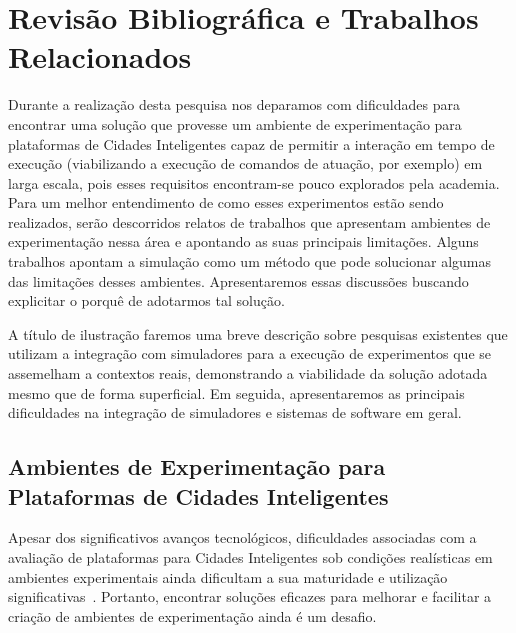 \chapter{Revisão Bibliográfica e Trabalhos Relacionados}
\label{cap:trab-relacionados}

Durante a realização desta pesquisa nos deparamos com dificuldades para encontrar uma solução que provesse um ambiente de experimentação para plataformas de Cidades Inteligentes capaz de permitir a
interação em tempo de execução (viabilizando a execução de comandos de atuação, por exemplo) em larga escala, pois esses requisitos encontram-se pouco explorados pela academia.
Para um melhor entendimento de como esses experimentos estão sendo realizados, serão descorridos relatos de trabalhos que apresentam ambientes de experimentação nessa área e apontando as suas
principais limitações.
Alguns trabalhos apontam a simulação como um método que pode solucionar algumas das limitações desses ambientes.
Apresentaremos essas discussões buscando explicitar o porquê de adotarmos tal solução.

A título de ilustração faremos uma breve descrição sobre pesquisas existentes que utilizam a integração com simuladores para a execução de experimentos que se assemelham a contextos reais, demonstrando
a viabilidade da solução adotada mesmo que de forma superficial.
Em seguida, apresentaremos as principais dificuldades na integração de simuladores e sistemas de software em geral.


\section{Ambientes de Experimentação para Plataformas de Cidades Inteligentes}


Apesar dos significativos avanços tecnológicos, dificuldades associadas com a avaliação de plataformas para Cidades Inteligentes sob condições realísticas em ambientes experimentais ainda dificultam
a sua maturidade e utilização significativas~\cite{sanchez_2014}.
Portanto, encontrar soluções eficazes para melhorar e facilitar a criação de ambientes de experimentação ainda é um desafio.


